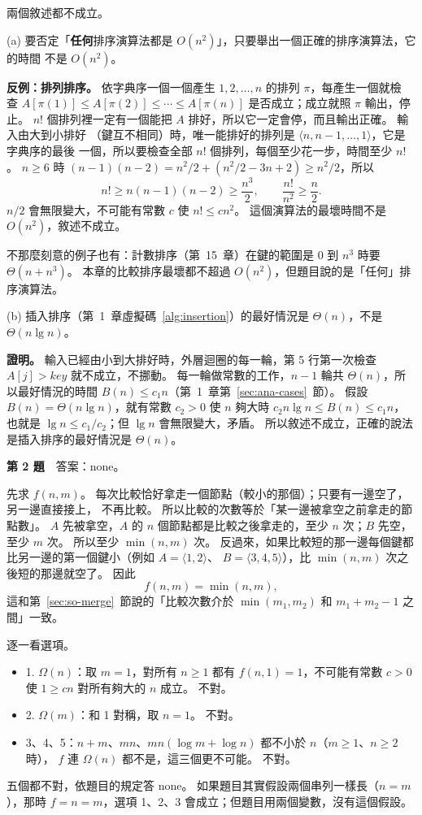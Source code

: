 兩個敘述都不成立。

(a) 要否定「\textbf{任何}排序演算法都是 $O(n^2)$」，只要舉出一個正確的排序演算法，它的時間
不是 $O(n^2)$。

\textbf{反例：排列排序。} 依字典序一個一個產生 $1, 2, \ldots, n$ 的排列 $\pi$，每產生一個就檢
查 $A[\pi(1)] \le A[\pi(2)] \le \cdots \le A[\pi(n)]$ 是否成立；成立就照 $\pi$ 輸出，停止。
$n!$ 個排列裡一定有一個能把 $A$ 排好，所以它一定會停，而且輸出正確。 輸入由大到小排好
（鍵互不相同）時，唯一能排好的排列是 $\langle n, n-1, \ldots, 1 \rangle$，它是字典序的最後
一個，所以要檢查全部 $n!$ 個排列，每個至少花一步，時間至少 $n!$。 $n \ge 6$ 時
$(n-1)(n-2) = n^2/2 + (n^2/2 - 3n + 2) \ge n^2/2$，所以
\[
n! \ge n(n-1)(n-2) \ge \frac{n^3}{2}, \qquad \frac{n!}{n^2} \ge \frac{n}{2}.
\]
$n/2$ 會無限變大，不可能有常數 $c$ 使 $n! \le cn^2$。 這個演算法的最壞時間不是 $O(n^2)$，敘述不成立。

不那麼刻意的例子也有：計數排序（第~15~章）在鍵的範圍是 $0$ 到 $n^3$ 時要 $\Theta(n + n^3)$。
本章的比較排序最壞都不超過 $O(n^2)$，但題目說的是「任何」排序演算法。

(b) 插入排序（第~1~章虛擬碼~\ref{alg:insertion}）的最好情況是 $\Theta(n)$，不是
$\Theta(n \lg n)$。

\textbf{證明。} 輸入已經由小到大排好時，外層迴圈的每一輪，第 5 行第一次檢查 $A[j] > \mathit{key}$
就不成立，不挪動。 每一輪做常數的工作，$n - 1$ 輪共 $\Theta(n)$，所以最好情況的時間
$B(n) \le c_1 n$（第~1~章第~\ref{sec:ana-cases}~節）。 假設 $B(n) = \Theta(n \lg n)$，就有常數
$c_2 > 0$ 使 $n$ 夠大時 $c_2 n \lg n \le B(n) \le c_1 n$，也就是 $\lg n \le c_1 / c_2$；但
$\lg n$ 會無限變大，矛盾。 所以敘述不成立，正確的說法是插入排序的最好情況是
$\Theta(n)$。

\textbf{第 2 題}　答案：none。

先求 $f(n, m)$。 每次比較恰好拿走一個節點（較小的那個）；只要有一邊空了，另一邊直接接上，
不再比較。 所以比較的次數等於「某一邊被拿空之前拿走的節點數」。 $A$ 先被拿空，$A$ 的 $n$
個節點都是比較之後拿走的，至少 $n$ 次；$B$ 先空，至少 $m$ 次。 所以至少 $\min(n, m)$ 次。
反過來，如果比較短的那一邊每個鍵都比另一邊的第一個鍵小（例如 $A = \langle 1, 2 \rangle$、
$B = \langle 3, 4, 5 \rangle$），比 $\min(n, m)$ 次之後短的那邊就空了。 因此
\[
f(n, m) = \min(n, m),
\]
這和第~\ref{sec:so-merge}~節說的「比較次數介於 $\min(m_1, m_2)$ 和 $m_1 + m_2 - 1$ 之間」一致。

逐一看選項。
\begin{itemize}
\item 1. $\Omega(n)$：取 $m = 1$，對所有 $n \ge 1$ 都有 $f(n, 1) = 1$，不可能有常數 $c > 0$ 使
$1 \ge cn$ 對所有夠大的 $n$ 成立。 不對。
\item 2. $\Omega(m)$：和 1 對稱，取 $n = 1$。 不對。
\item 3、4、5：$n + m$、$mn$、$mn(\log m + \log n)$ 都不小於 $n$（$m \ge 1$、$n \ge 2$ 時），
$f$ 連 $\Omega(n)$ 都不是，這三個更不可能。 不對。
\end{itemize}
五個都不對，依題目的規定答 none。 如果題目其實假設兩個串列一樣長（$n = m$），那時
$f = n = m$，選項 1、2、3 會成立；但題目用兩個變數，沒有這個假設。

